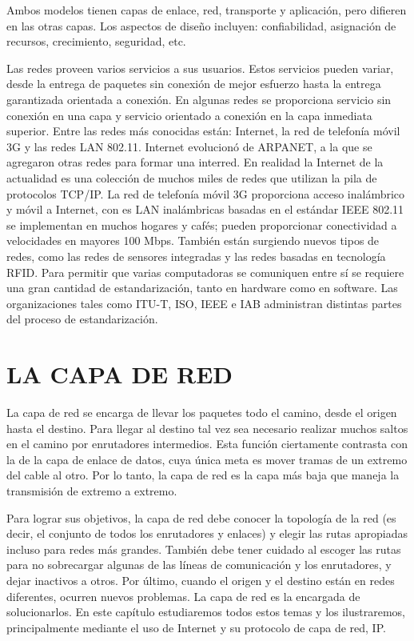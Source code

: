 \documentclass[10pt,a4paper]{report}
\begin{document}
Ambos modelos tienen capas de enlace, red, transporte y aplicación, pero difieren en 
las otras capas. Los aspectos de diseño incluyen: confiabilidad, asignación de recursos, 
crecimiento, seguridad, etc.
\par Las redes proveen varios servicios a sus usuarios. Estos servicios pueden variar, 
desde la entrega de paquetes sin conexión de mejor esfuerzo hasta la entrega 
garantizada orientada a conexión. En algunas redes se proporciona servicio sin 
conexión en una capa y servicio orientado a conexión en la capa inmediata superior.
Entre las redes más conocidas están: Internet, la red de telefonía móvil 3G y las redes 
LAN 802.11. Internet evolucionó de ARPANET, a la que se agregaron otras redes para 
formar una interred. En realidad la Internet de la actualidad es una colección de 
muchos miles de redes que utilizan la pila de protocolos TCP/IP. La red de telefonía 
móvil 3G proporciona acceso inalámbrico y móvil a Internet, con es LAN inalámbricas 
basadas en el estándar IEEE 802.11 se implementan en muchos hogares y cafés; 
pueden proporcionar conectividad a velocidades en mayores 100 Mbps. También están 
surgiendo nuevos tipos de redes, como las redes de sensores integradas y las redes 
basadas en tecnología RFID.
Para permitir que varias computadoras se comuniquen entre sí se requiere una gran 
cantidad de estandarización, tanto en hardware como en software. Las organizaciones 
tales como ITU-T, ISO, IEEE e IAB administran distintas partes del proceso de 
estandarización.




\chapter{LA CAPA DE RED}
La capa de red se encarga de llevar los paquetes todo el camino, desde el origen hasta el destino. Para llegar al destino tal vez sea necesario realizar muchos saltos en el camino por enrutadores intermedios. Esta función ciertamente contrasta con la de la capa de enlace de datos, cuya única meta es mover tramas de un extremo del cable al otro. Por lo tanto, la capa de red es la capa más baja que maneja la transmisión de extremo a extremo.
\par Para lograr sus objetivos, la capa de red debe conocer la topología de la red (es
decir, el conjunto de todos los enrutadores y enlaces) y elegir las rutas apropiadas
incluso para redes más grandes. También debe tener cuidado al escoger las rutas para
no sobrecargar algunas de las líneas de comunicación y los enrutadores, y dejar
inactivos a otros. Por último, cuando el origen y el destino están en redes diferentes, ocurren nuevos problemas. La capa de red es la encargada de solucionarlos. En este capítulo estudiaremos todos estos temas y los ilustraremos, principalmente mediante el uso de Internet y su protocolo de capa de red, IP.
\end{document}
